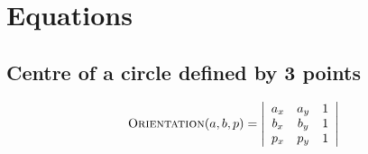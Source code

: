
\graphicspath{{appendices/equations/figs/}}

\chapter{Equations}%
\label{app:equations}


%
\section{Centre of a circle defined by 3 points}%
\label{sec:centrecircle}



\begin{equation}
  \textrm{O}\textsc{rientation}(a, b, p) = 
  \left| 
  \begin{array}{cccc}
    a_{x} & a_{y} & 1 \\
    b_{x} & b_{y} & 1 \\
    p_{x} & p_{y} & 1 
  \end{array} 
  \right| 
\end{equation}
